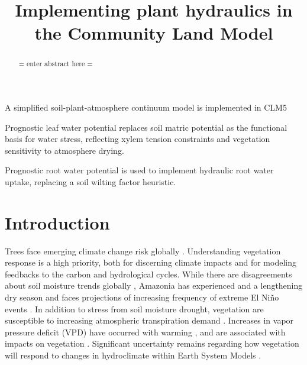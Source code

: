 \documentclass[draft,linenumbers]{agujournal}
\begin{document}
\title{Implementing plant hydraulics in the Community Land Model}



\begin{keypoints}
\item A simplified soil-plant-atmosphere continuum model is implemented in CLM5
\item Prognostic leaf water potential replaces soil matric potential as the functional basis for water stress, reflecting xylem tension constraints and vegetation sensitivity to atmosphere drying. 
\item Prognostic root water potential is used to implement hydraulic root water uptake, replacing a soil wilting factor heuristic.
\end{keypoints}



\begin{abstract}
= enter abstract here =
\end{abstract}


\section{Introduction}

Trees face emerging climate change risk globally \citep{allen2010,anderegg2013b}.
Understanding vegetation response is a high priority, both for discerning climate impacts and for modeling feedbacks to the carbon and hydrological cycles.
While there are disagreements about soil moisture trends globally \citep{dai2013,sheffield2012}, 
Amazonia has experienced and a lengthening dry season \citep{fu2013} and faces projections of increasing frequency of extreme El Ni\~no events \citep{cai2014}.
In addition to stress from soil moisture drought, vegetation are susceptible to increasing atmospheric transpiration demand \citep{restaino2016,novick2016b}.
Increases in vapor pressure deficit (VPD) have occurred with warming \citep{ficklin2017,seager2015}, and are associated with impacts on vegetation \citep{williams2013,mcdowell2015}.
Significant uncertainty remains regarding how vegetation will respond to changes in hydroclimate within Earth System Models \citep{dekauwe2017,friedlingstein2014}.
\end{document}
